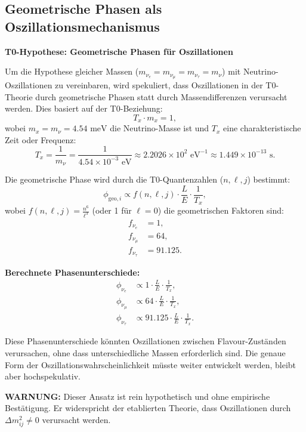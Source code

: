 \documentclass[12pt,a4paper]{article}
\begin{document}
	\subsection{Geometrische Phasen als Oszillationsmechanismus}
	
	\begin{speculation}
		\textbf{T0-Hypothese: Geometrische Phasen für Oszillationen}
		
		Um die Hypothese gleicher Massen (\(m_{\nu_e} = m_{\nu_\mu} = m_{\nu_\tau} = m_\nu\)) mit Neutrino-Oszillationen zu vereinbaren, wird spekuliert, dass Oszillationen in der T0-Theorie durch geometrische Phasen statt durch Massendifferenzen verursacht werden. Dies basiert auf der T0-Beziehung:
		\[
		T_x \cdot m_x = 1,
		\]
		wobei \(m_x = m_\nu = 4.54 \text{ meV}\) die Neutrino-Masse ist und \(T_x\) eine charakteristische Zeit oder Frequenz:
		\[
		T_x = \frac{1}{m_\nu} = \frac{1}{4.54 \times 10^{-3} \text{ eV}} \approx 2.2026 \times 10^2 \text{ eV}^{-1} \approx 1.449 \times 10^{-13} \text{ s}.
		\]
		
		Die geometrische Phase wird durch die T0-Quantenzahlen (\(n, \ell, j\)) bestimmt:
		\[
		\phi_{\text{geo}, i} \propto f(n, \ell, j) \cdot \frac{L}{E} \cdot \frac{1}{T_x},
		\]
		wobei \(f(n, \ell, j) = \frac{n^6}{\ell^3}\) (oder 1 für \(\ell = 0\)) die geometrischen Faktoren sind:
		\begin{align}
			f_{\nu_e} &= 1, \\
			f_{\nu_\mu} &= 64, \\
			f_{\nu_\tau} &= 91.125.
		\end{align}
		
		\textbf{Berechnete Phasenunterschiede:}
		\begin{align}
			\phi_{\nu_e} &\propto 1 \cdot \frac{L}{E} \cdot \frac{1}{T_x}, \\
			\phi_{\nu_\mu} &\propto 64 \cdot \frac{L}{E} \cdot \frac{1}{T_x}, \\
			\phi_{\nu_\tau} &\propto 91.125 \cdot \frac{L}{E} \cdot \frac{1}{T_x}.
		\end{align}
		
		Diese Phasenunterschiede könnten Oszillationen zwischen Flavour-Zuständen verursachen, ohne dass unterschiedliche Massen erforderlich sind. Die genaue Form der Oszillationswahrscheinlichkeit müsste weiter entwickelt werden, bleibt aber hochspekulativ.
		
		\textbf{WARNUNG:} Dieser Ansatz ist rein hypothetisch und ohne empirische Bestätigung. Er widerspricht der etablierten Theorie, dass Oszillationen durch \(\Delta m^2_{ij} \neq 0\) verursacht werden.
	\end{speculation}
	
\end{document}
